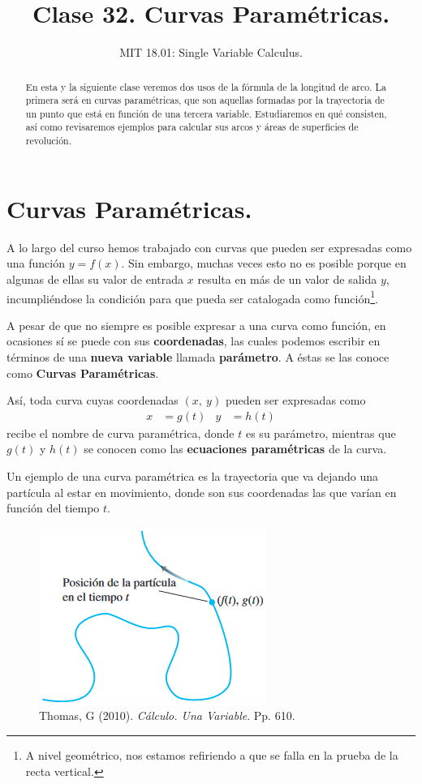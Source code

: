 \documentclass[12pt]{article}
\title{Clase 32. Curvas Paramétricas.}
\author{MIT 18.01: Single Variable Calculus.}
\date{}
\begin{document}
\maketitle

\begin{abstract}
\noindent En esta y la siguiente clase veremos dos usos de la fórmula de la longitud de arco. La primera será en curvas paramétricas, que son aquellas formadas por la trayectoria de un punto que está en función de una tercera variable. Estudiaremos en qué consisten, así como revisaremos ejemplos para calcular sus arcos y áreas de superficies de revolución.
\end{abstract}


\section{Curvas Paramétricas.}

A lo largo del curso hemos trabajado con curvas que pueden ser expresadas como una función $y = f(x)$. Sin embargo, muchas veces esto no es posible porque en algunas de ellas su valor de entrada $x$ resulta en más de un valor de salida $y$, incumpliéndose la condición para que pueda ser catalogada como función\footnote{A nivel geométrico, nos estamos refiriendo a que se falla en la prueba de la recta vertical.}.

A pesar de que no siempre es posible expresar a una curva como función, en ocasiones sí se puede con sus \textbf{coordenadas}, las cuales podemos escribir en términos de una \textbf{nueva variable} llamada \textbf{parámetro}. A éstas se las conoce como \textbf{Curvas Paramétricas}.

Así, toda curva cuyas coordenadas $(x, \ y)$ pueden ser expresadas como
\begin{align*}
  x &= g(t) &  y &= h(t)
\end{align*}
recibe el nombre de curva paramétrica, donde $t$ es su parámetro, mientras que $g(t)$ y $h(t)$ se conocen como las \textbf{ecuaciones paramétricas} de la curva.

Un ejemplo de una curva paramétrica es la trayectoria que va dejando una partícula al estar en movimiento, donde son sus coordenadas las que varían en función del tiempo $t$.

\newpage

\begin{figure}[hbt!]
\centering
\includegraphics[scale=0.55]{curva-parametrica.jpg}
\caption{Thomas, G (2010). \textit{Cálculo. Una Variable}. Pp. 610.}
\end{figure}
\end{document}
